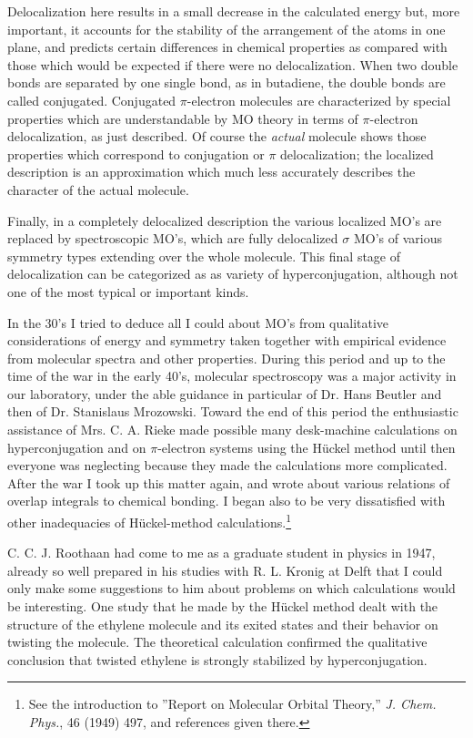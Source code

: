 \documentclass[11pt]{memoir}
\begin{document}
Delocalization here results in a small decrease in the calculated energy but, more important, it accounts for the stability of the arrangement of the atoms in one plane, and predicts certain differences in chemical properties as compared with those which would be expected if there were no delocalization.  When two double bonds are separated by one single bond, as in butadiene, the double bonds are called conjugated.  Conjugated $\pi$-electron molecules are characterized by special properties which are understandable by MO theory in terms of $\pi$-electron delocalization, as just described.  Of course the \emph{actual} molecule shows those properties which correspond to conjugation or $\pi$ delocalization; the localized description is an approximation which much less accurately describes the character of the actual molecule.


Finally, in a completely delocalized description the various localized MO's are replaced by spectroscopic MO's, which are fully delocalized $\sigma$ MO's of various symmetry types extending over the whole molecule.  This final stage of delocalization can be categorized as as variety of hyperconjugation, although not one of the most typical or important kinds.

In the 30's I tried to deduce all I could about MO's from qualitative considerations of energy and symmetry taken together with empirical evidence from molecular spectra and other properties.  During this period and up to the time of the war in the early 40's, molecular spectroscopy was a major activity in our laboratory, under the able guidance in particular of Dr. Hans Beutler and then of Dr. Stanislaus Mrozowski.  Toward the end of this period the enthusiastic assistance of Mrs. C. A. Rieke made possible many desk-machine calculations on hyperconjugation and on $\pi$-electron systems using the H\"{u}ckel method until then everyone was neglecting because they made the calculations more complicated.  After the war I took up this matter again, and wrote about various relations of overlap integrals to chemical bonding.  I began also to be very dissatisfied with other inadequacies of H\"{u}ckel-method calculations.\footnote{See the introduction to ''Report on Molecular Orbital Theory,'' \emph{J. Chem. Phys.}, 46 (1949) 497, and references given there.}

C. C. J. Roothaan had come to me as a graduate student in physics in 1947, already so well prepared in his studies with R. L. Kronig at Delft that I could only make some suggestions to him about problems on which calculations would be interesting.  One study that he made by the H\"{u}ckel method dealt with the structure of the ethylene molecule and its exited states and their behavior on twisting the molecule.  The theoretical calculation confirmed the qualitative conclusion that twisted ethylene is strongly stabilized by hyperconjugation.
\end{document}
